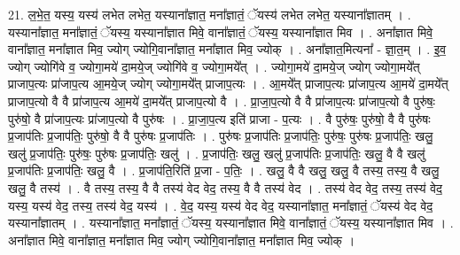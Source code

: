 \documentclass[17pt]{extarticle}
\begin{document}
21. ल॒भे॒त॒ यस्य॒ यस्य॑ लभेत लभेत॒ यस्याना᳚ज्ञात॒ मना᳚ज्ञातं॒ ॅयस्य॑ लभेत लभेत॒ यस्याना᳚ज्ञातम् । . यस्याना᳚ज्ञात॒ मना᳚ज्ञातं॒ ॅयस्य॒ यस्याना᳚ज्ञात मिवे॒ वाना᳚ज्ञातं॒ ॅयस्य॒ यस्याना᳚ज्ञात मिव । . अना᳚ज्ञात मिवे॒ वाना᳚ज्ञात॒ मना᳚ज्ञात मिव॒ ज्योग् ज्योगि॒वाना᳚ज्ञात॒ मना᳚ज्ञात मिव॒ ज्योक् । . अना᳚ज्ञात॒मित्यना᳚ - ज्ञा॒त॒म् । . इ॒व॒ ज्योग् ज्योगि॑वे व॒ ज्योगा॒मये॑ दा॒मये॒ज् ज्योगि॑वे व॒ ज्योगा॒मये᳚त् । . ज्योगा॒मये॑ दा॒मये॒ज् ज्योग् ज्योगा॒मये᳚त् प्राजाप॒त्यः प्रा॑जाप॒त्य आ॒मये॒ज् ज्योग् ज्योगा॒मये᳚त् प्राजाप॒त्यः । . आ॒मये᳚त् प्राजाप॒त्यः प्रा॑जाप॒त्य आ॒मये॑ दा॒मये᳚त् प्राजाप॒त्यो वै वै प्रा॑जाप॒त्य आ॒मये॑ दा॒मये᳚त् प्राजाप॒त्यो वै । . प्रा॒जा॒प॒त्यो वै वै प्रा॑जाप॒त्यः प्रा॑जाप॒त्यो वै पुरु॑षः॒ पुरु॑षो॒ वै प्रा॑जाप॒त्यः प्रा॑जाप॒त्यो वै पुरु॑षः । . प्रा॒जा॒प॒त्य इति॑ प्राजा - प॒त्यः । . वै पुरु॑षः॒ पुरु॑षो॒ वै वै पुरु॑षः प्र॒जाप॑तिः प्र॒जाप॑तिः॒ पुरु॑षो॒ वै वै पुरु॑षः प्र॒जाप॑तिः । . पुरु॑षः प्र॒जाप॑तिः प्र॒जाप॑तिः॒ पुरु॑षः॒ पुरु॑षः प्र॒जाप॑तिः॒ खलु॒ खलु॑ प्र॒जाप॑तिः॒ पुरु॑षः॒ पुरु॑षः प्र॒जाप॑तिः॒ खलु॑ । . प्र॒जाप॑तिः॒ खलु॒ खलु॑ प्र॒जाप॑तिः प्र॒जाप॑तिः॒ खलु॒ वै वै खलु॑ प्र॒जाप॑तिः प्र॒जाप॑तिः॒ खलु॒ वै । . प्र॒जाप॑ति॒रिति॑ प्र॒जा - प॒तिः॒ । . खलु॒ वै वै खलु॒ खलु॒ वै तस्य॒ तस्य॒ वै खलु॒ खलु॒ वै तस्य॑ । . वै तस्य॒ तस्य॒ वै वै तस्य॑ वेद वेद॒ तस्य॒ वै वै तस्य॑ वेद । . तस्य॑ वेद वेद॒ तस्य॒ तस्य॑ वेद॒ यस्य॒ यस्य॑ वेद॒ तस्य॒ तस्य॑ वेद॒ यस्य॑ । . वे॒द॒ यस्य॒ यस्य॑ वेद वेद॒ यस्याना᳚ज्ञात॒ मना᳚ज्ञातं॒ ॅयस्य॑ वेद वेद॒ यस्याना᳚ज्ञातम् । . यस्याना᳚ज्ञात॒ मना᳚ज्ञातं॒ ॅयस्य॒ यस्याना᳚ज्ञात मिवे॒ वाना᳚ज्ञातं॒ ॅयस्य॒ यस्याना᳚ज्ञात मिव । . अना᳚ज्ञात मिवे॒ वाना᳚ज्ञात॒ मना᳚ज्ञात मिव॒ ज्योग् ज्योगि॒वाना᳚ज्ञात॒ मना᳚ज्ञात मिव॒ ज्योक् । \newline
\end{document}
